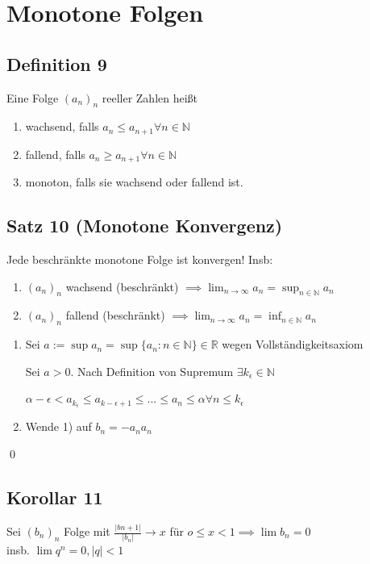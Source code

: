\documentclass[fleqn]{scrbook}
\newcommand{\R}{\mathbb{R}}
\newcommand{\N}{\mathbb{N}}
\renewenvironment{proof}{{\bfseries Beweis }}{\qed}
\begin{document}
\section{Monotone Folgen}
\subsection{Definition 9} Eine Folge $(a_n)_n$ reeller Zahlen heißt
\begin{enumerate}[1)]
\item wachsend, falls $a_n \leq a_{n+1} \forall n \in \N$
\item fallend, falls $a_n \geq a_{n+1} \forall n \in \N$
\item monoton, falls sie wachsend oder fallend ist.
\end{enumerate}
\subsection{Satz 10 (Monotone Konvergenz)} Jede beschränkte monotone Folge ist konvergen! Insb:
\begin{enumerate}[1)]
\item $(a_n)_n$ wachsend (beschränkt) $\implies \lim_{n\rightarrow\infty} a_n = \sup_{n\in\N}a_n$
\item $(a_n)_n$ fallend (beschränkt) $\implies \lim_{n\rightarrow \infty} a_n = \inf_{n\in\N}a_n$
\end{enumerate}
\begin{proof}
\begin{enumerate}[1)]
\item Sei $a:=\sup a_n = \sup \{a_n: n\in\N\}\in\R$ wegen Vollständigkeitsaxiom

Sei $a>0$. Nach Definition von Supremum $\exists k_\epsilon \in \N$

$\alpha - \epsilon < a_{k_\epsilon} \leq a_{k-{\epsilon + 1}} \leq ... \leq a_n \leq \alpha \forall n \leq k_\epsilon$
\item Wende 1) auf $b_n = -a_n a_n$
\end{enumerate}
\end{proof}
\subsection{Korollar 11} Sei $(b_n)_n$ Folge mit $\frac{|b{n+1}|}{|b_n|} \rightarrow x$ für $o \leq x < 1 \implies \lim b_n = 0$\\insb. $\lim q^n = 0, |q|<1$
\end{document}
